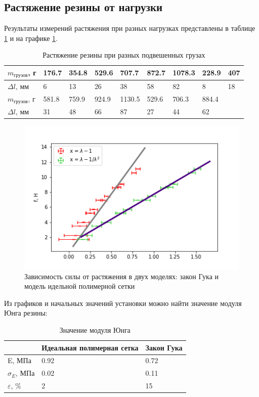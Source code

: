 \documentclass[a4paper,12pt]{article} %
\begin{document}
\subsection*{Растяжение резины от нагрузки}
Результаты измерений растяжения при разных нагрузках представлены в таблице \ref{f(l)_tab} и на графике \ref{f(l)_pic}.

\begin{table}[h!]
\caption{Растяжение резины при разных подвешенных грузах } \label{f(l)_tab}
\begin{tabular}{|l|l|l|l|l|l|l|l|l|}
\hline
$m_{грузов}$, г      & 176.7 & 354.8 & 529.6 & 707.7  & 872.7 & 1078.3 & 228.9 & 407 \\ \hline
$\Delta l$, мм & 6     & 13    & 26    & 38     & 58    & 82     & 8     & 18  \\ \hline \hline
$m_{грузов}$, г       & 581.8 & 759.9 & 924.9 & 1130.5 & 529.6 & 706.3  & 884.4 &     \\ \hline
$\Delta l$, мм  & 31    & 48    & 66    & 87     & 27    & 44     & 62    &     \\ \hline
\end{tabular}
\end{table}

\begin{figure}[h!]
\begin{center}
\includegraphics[width=\textwidth]{f(l)}
\end{center}
\caption{Зависимость силы от растяжения в двух моделях: закон Гука и модель идельной полимерной сетки} \label{f(l)_pic}
\end{figure}
Из графиков и начальных значений установки можно найти значение модуля Юнга резины:
\begin{table}[h!]
\caption{Значение модуля Юнга}
\label{юнг}
\begin{tabular}{|l|l|l|}
\hline
                  & Идеальная полимерная сетка & Закон Гука \\ \hline
E, МПа            & 0.92                       & 0.72       \\ \hline
$\sigma_E$, МПа   & 0.02                       & 0.11       \\ \hline
$\varepsilon$, \% & 2                          & 15         \\ \hline
\end{tabular}
\end{table}
\end{document}
